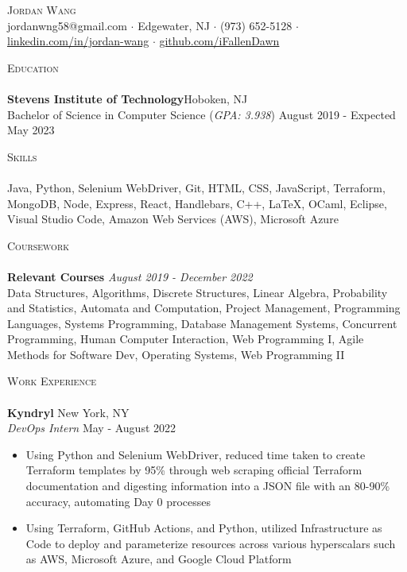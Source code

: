 \documentclass[10pt]{article}
\newcommand{\lineunder} {
    \vspace*{-8pt} \\
    \hspace*{-18pt} \hrulefill \\
}
\newcommand{\header} [1] {
    {\hspace*{-18pt}\vspace*{6pt} \textsc{#1}}
    \vspace*{-6pt} \lineunder
}
\begin{document}
\vspace*{-40pt}

    

\vspace*{2pt}
\begin{center}
	{\Huge \scshape {Jordan Wang}}\\
	\vspace{2mm}
	jordanwng58@gmail.com $\cdot$ Edgewater, NJ $\cdot$ (973) 652-5128 $\cdot$ \href{https://www.linkedin.com/in/jordan-wang/}{linkedin.com/in/jordan-wang} $\cdot$ \href{https://github.com/iFallenDawn}{github.com/iFallenDawn} \\
\end{center}
\header{Education}
\textbf{Stevens Institute of Technology}\hfill Hoboken, NJ\\
Bachelor of Science in Computer Science (\textit{GPA: 3.938}) \hfill August 2019 - Expected May 2023\\
\vspace{2mm}

\header{Skills}
	Java, Python, Selenium WebDriver, Git, HTML, CSS, JavaScript, Terraform, MongoDB, Node, Express, React, Handlebars, C++, \LaTeX, OCaml, Eclipse, Visual Studio Code, Amazon Web Services (AWS), Microsoft Azure                    \\
\vspace{2mm}

\header{Coursework}
{\textbf{Relevant Courses}} {\sl August 2019 - December 2022} \hfill 
\\
Data Structures, Algorithms, Discrete Structures, Linear Algebra, Probability and Statistics, Automata and Computation, Project Management, Programming Languages, Systems Programming, Database Management Systems, Concurrent Programming, Human Computer Interaction, Web Programming I, Agile Methods for Software Dev, Operating Systems, Web Programming II\\
\vspace{2mm}

\header{Work Experience}
\textbf{Kyndryl} \hfill New York, NY\\
\textit{DevOps Intern} \hfill May - August 2022\\
\vspace{-1mm}
\begin{itemize}[noitemsep,parsep=0pt,partopsep=0pt]\itemsep 1pt
    \item Using Python and Selenium WebDriver, reduced time taken to create Terraform templates by 95\% through web scraping official Terraform documentation and digesting information into a JSON file with an 80-90\% accuracy, automating Day 0 processes
    \item Using Terraform, GitHub Actions, and Python, utilized Infrastructure as Code to deploy and parameterize resources across various hyperscalars such as AWS, Microsoft Azure, and Google Cloud Platform
\end{itemize}
\end{document}
